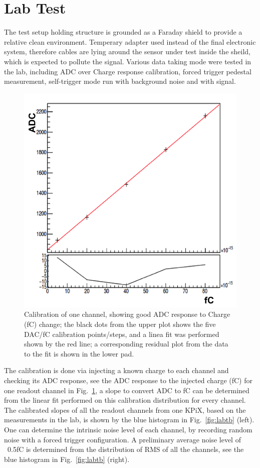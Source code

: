 \documentclass[conference]{IEEEtran}
\begin{document}
\section{Lab Test}
The test setup holding structure is grounded as a Faraday shield to provide a relative clean environment.
Temperary adapter used instead of the final electronic system, therefore cables are lying around the sensor under test inside the sheild, which is expected to pollute the signal.
Various data taking mode were tested in the lab, including ADC over Charge response calibration, forced trigger pedestal measurement, self-trigger mode run with background noise and with signal.
\begin{figure}[!ht]%
  \centering
  \includegraphics[width=0.6\linewidth]{pics/lab_2.png}
  \caption{ Calibration of one channel, showing good ADC response to Charge (fC) change;
  the black dots from the upper plot shows the five DAC/fC calibration points/steps, and a linea fit was performed shown by the red line;
  a corresponding residual plot from the data to the fit is shown in the lower pad.}%
\label{fig:lab1}%
\end{figure}

The calibration is done via injecting a known charge to each channel and checking its ADC response,
see the ADC response to the injected charge (fC) for one readout channel in Fig.~\ref{fig:lab1},
a slope to convert ADC to fC can be determined from the linear fit performed on this calibration distribution for every channel.
The calibrated slopes of all the readout channels from one KPiX, based on the measurements in the lab,
is shown by the blue histogram in Fig.~\ref{fig:labtb} (left).
One can determine the intrinsic noise level of each channel, by recording random noise with a forced trigger configuration.
A preliminary average noise level of ~0.5fC is determined from the distribution of RMS of all the channels, see the blue histogram in Fig.~\ref{fig:labtb} (right).
\end{document}
